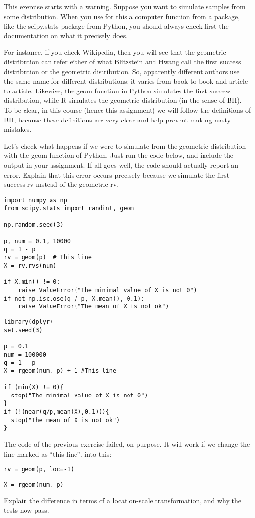 \begin{exercise}
This exercise starts with a warning.
Suppose you want to simulate samples from some distribution.
When you use for this a computer function from a package, like the scipy.stats package from Python, you should always check first the documentation on what it precisely does.

For instance, if you check Wikipedia, then you will see that the geometric distribution can refer either of what Blitzstein and Hwang call the first success distribution or the geometric distribution.
So, apparently different authors use the same name for different distributions; it varies from book to book and article to article.
Likewise, the geom function in Python simulates the first success distribution, while R simulates the geometric distribution (in the sense of BH).
To be clear, in this course (hence this assignment) we will follow the definitions of BH, because these definitions are very clear and help prevent making nasty mistakes.


Let's check what happens if we were to simulate from the geometric distribution with the geom function of Python.
Just run the code below, and include the output in your assignment.
If all goes well, the code should actually report an error.
Explain that this error occurs precisely because we simulate the first success rv instead of the geometric rv.
\begin{verbatim}
import numpy as np
from scipy.stats import randint, geom

np.random.seed(3)

p, num = 0.1, 10000
q = 1 - p
rv = geom(p)  # This line
X = rv.rvs(num)

if X.min() != 0:
    raise ValueError("The minimal value of X is not 0")
if not np.isclose(q / p, X.mean(), 0.1):
    raise ValueError("The mean of X is not ok")
\end{verbatim}


\begin{verbatim}
library(dplyr)
set.seed(3)

p = 0.1
num = 100000
q = 1 - p
X = rgeom(num, p) + 1 #This line

if (min(X) != 0){
  stop("The minimal value of X is not 0")
}
if (!(near(q/p,mean(X),0.1))){
  stop("The mean of X is not ok")
}
\end{verbatim}
\end{exercise}


\begin{exercise}
The code of the previous exercise failed, on purpose.   It will work if we change the line marked as ``this line'', into this:
\begin{verbatim}
rv = geom(p, loc=-1)
\end{verbatim}

\begin{verbatim}
X = rgeom(num, p)
\end{verbatim}
Explain the difference in terms of a location-scale transformation, and why the tests now pass.
\end{exercise}


